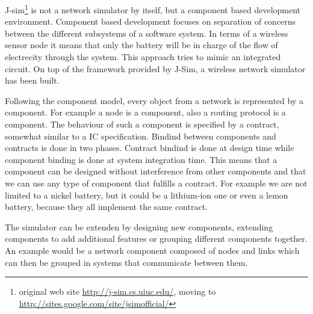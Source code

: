 \label{subsec:jsim}
J-sim\footnote {original web site \url{http://j-sim.cs.uiuc.edu/}, moving to 
\url{http://sites.google.com/site/jsimofficial/}} is not a network simulator
by itself, but a component based development environment. Component based
development focuses on separation of concerns between the different subsystems
of a software system. In terms of a wireless sensor node it means that only 
the battery will be in charge of the flow of electrecity through the system.
This approach tries to mimic an integrated circuit. On top of the framework 
provided by J-Sim, a wireless network simulator has been built.

Following the component model, every object from a network is represented
by a component. For example a node is a component, also a routing protocol
is a component. The behaviour of such a component is specified by a contract,
somewhat similar to a IC specification. Bindind between components and contracts
is done in two phases. Contract bindind is done at design time while component
binding is done at system integration time. This means that a component can be
designed without interference from other components and that we can use any type
of component that fulfills a contract. For example we are not limited to a nickel
battery, but it could be a lithium-ion one or even a lemon battery, because they all
implement the same contract.

The simulator can be extenden by designing new components, extending components to add
additional features or grouping different components together. An example would be a 
network component composed of nodes and links which can then be grouped in systems that
communicate between them.
